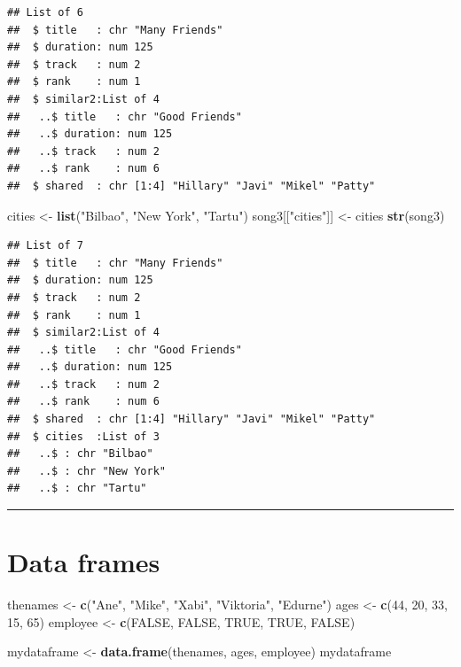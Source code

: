 \documentclass[]{book}
\newenvironment{Shaded}{\begin{snugshade}}{\end{snugshade}}
\newcommand{\KeywordTok}[1]{\textcolor[rgb]{0.13,0.29,0.53}{\textbf{{#1}}}}
\newcommand{\DecValTok}[1]{\textcolor[rgb]{0.00,0.00,0.81}{{#1}}}
\newcommand{\StringTok}[1]{\textcolor[rgb]{0.31,0.60,0.02}{{#1}}}
\newcommand{\OtherTok}[1]{\textcolor[rgb]{0.56,0.35,0.01}{{#1}}}
\newcommand{\NormalTok}[1]{{#1}}
\begin{document}
\begin{verbatim}
## List of 6
##  $ title   : chr "Many Friends"
##  $ duration: num 125
##  $ track   : num 2
##  $ rank    : num 1
##  $ similar2:List of 4
##   ..$ title   : chr "Good Friends"
##   ..$ duration: num 125
##   ..$ track   : num 2
##   ..$ rank    : num 6
##  $ shared  : chr [1:4] "Hillary" "Javi" "Mikel" "Patty"
\end{verbatim}

\begin{Shaded}
\begin{Highlighting}[]
\NormalTok{cities <-}\StringTok{ }\KeywordTok{list}\NormalTok{(}\StringTok{"Bilbao"}\NormalTok{, }\StringTok{"New York"}\NormalTok{, }\StringTok{"Tartu"}\NormalTok{)}
\NormalTok{song3[[}\StringTok{"cities"}\NormalTok{]] <-}\StringTok{ }\NormalTok{cities}
\KeywordTok{str}\NormalTok{(song3)}
\end{Highlighting}
\end{Shaded}

\begin{verbatim}
## List of 7
##  $ title   : chr "Many Friends"
##  $ duration: num 125
##  $ track   : num 2
##  $ rank    : num 1
##  $ similar2:List of 4
##   ..$ title   : chr "Good Friends"
##   ..$ duration: num 125
##   ..$ track   : num 2
##   ..$ rank    : num 6
##  $ shared  : chr [1:4] "Hillary" "Javi" "Mikel" "Patty"
##  $ cities  :List of 3
##   ..$ : chr "Bilbao"
##   ..$ : chr "New York"
##   ..$ : chr "Tartu"
\end{verbatim}

\begin{center}\rule{0.5\linewidth}{\linethickness}\end{center}

\section{Data frames}\label{data-frames}

\begin{Shaded}
\begin{Highlighting}[]
\NormalTok{thenames <-}\StringTok{ }\KeywordTok{c}\NormalTok{(}\StringTok{"Ane"}\NormalTok{, }\StringTok{"Mike"}\NormalTok{, }\StringTok{"Xabi"}\NormalTok{, }\StringTok{"Viktoria"}\NormalTok{, }\StringTok{"Edurne"}\NormalTok{)}
\NormalTok{ages <-}\StringTok{ }\KeywordTok{c}\NormalTok{(}\DecValTok{44}\NormalTok{, }\DecValTok{20}\NormalTok{, }\DecValTok{33}\NormalTok{, }\DecValTok{15}\NormalTok{, }\DecValTok{65}\NormalTok{)}
\NormalTok{employee <-}\StringTok{ }\KeywordTok{c}\NormalTok{(}\OtherTok{FALSE}\NormalTok{, }\OtherTok{FALSE}\NormalTok{, }\OtherTok{TRUE}\NormalTok{, }\OtherTok{TRUE}\NormalTok{, }\OtherTok{FALSE}\NormalTok{)}

\NormalTok{mydataframe <-}\StringTok{ }\KeywordTok{data.frame}\NormalTok{(thenames, ages, employee)}
\NormalTok{mydataframe}
\end{Highlighting}
\end{Shaded}
\end{document}
